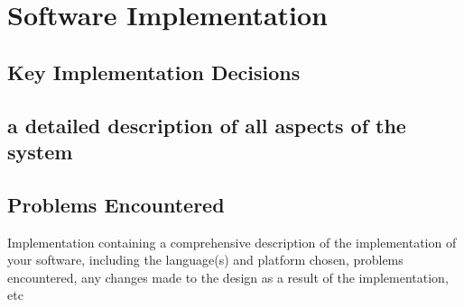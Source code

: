 \section{Software Implementation}

\subsection{Key Implementation Decisions}
\subsection{a detailed description of all aspects of the system}
\subsection{Problems Encountered}

{\color{red} 
Implementation containing a comprehensive description of the implementation of your software, including the language(s) and platform chosen, problems encountered, any changes made to the design as a result of the implementation, etc
}